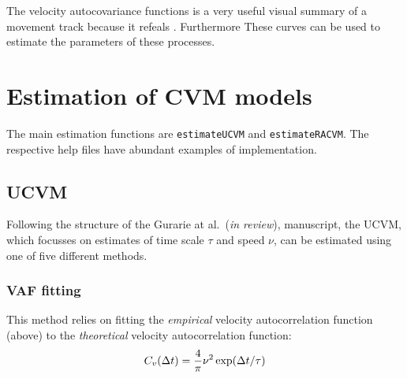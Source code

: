 \documentclass[10pt]{article}\usepackage[]{graphicx}\usepackage[]{color}
\begin{document}
\noindent The velocity autocovariance functions is a very useful visual summary of a movement track because it refeals . Furthermore These curves can be used to estimate the parameters of these processes. 

\section{Estimation of CVM models}

The main estimation functions are \texttt{estimateUCVM} and \texttt{estimateRACVM}.  The respective help files have abundant examples of implementation. 

\subsection{UCVM}

Following the structure of the Gurarie at al.~(\emph{in review}), manuscript, the UCVM, which focusses on estimates of time scale $\tau$ and speed $\nu$, can be estimated using one of five different methods.

\subsubsection{VAF fitting}

This method relies on fitting the \emph{empirical} velocity autocorrelation function (above) to the \emph{theoretical} velocity autocorrelation function:
$$C_v(\Delta t) = {4 \over \pi} \nu^2 \exp(\Delta t / \tau)$$
\end{document}

